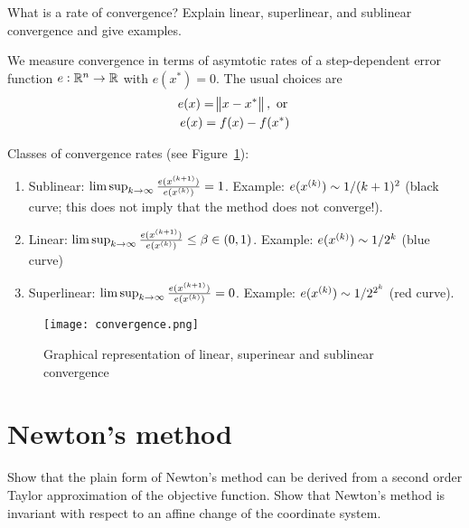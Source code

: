 \documentclass{article}
\begin{document}
\begin{question}
  What is a rate of convergence? Explain linear, superlinear, and sublinear convergence and give
  examples.
\end{question}

We measure convergence in terms of asymtotic rates of a step-dependent error function
\(e: \RR^n \to \RR\) with \(e(x^*) = 0\).  The usual choices are
\begin{gather*}
  e(x) = \enVert[1]{x - x^*}, \text{ or } \\
  e(x) = f(x) - f(x^*)
\end{gather*}

Classes of convergence rates (see Figure~\ref{fig:convergence}):
\begin{enumerate}
\item Sublinear: \(\limsup_{k \to \infty} \frac{e(\kth[k+1]{x})}{e(\kth{x})} = 1\). Example:
  \(e(\kth{x}) \sim 1/(k + 1)^2\) (black curve; this does not imply that the method does not
  converge!).
\item Linear: \(\limsup_{k \to \infty} \frac{e(\kth[k+1]{x})}{e(\kth{x})} \leq \beta \in (0, 1)\).
  Example: \(e(\kth{x}) \sim 1/2^k\) (blue curve)
\item Superlinear: \(\limsup_{k \to \infty} \frac{e(\kth[k+1]{x})}{e(\kth{x})} = 0\). Example:
  \(e(\kth{x}) \sim 1/2^{2^k}\) (red curve).
\end{enumerate}

\begin{figure}[H]
  \centering
  \texttt{[image: convergence.png]}
  \caption{Graphical representation of linear, superinear and sublinear
    convergence \label{fig:convergence}}
\end{figure}

\section{Newton's method}

\begin{question}
  Show that the plain form of Newton’s method can be derived from a second order Taylor
  approximation of the objective function. Show that Newton’s method is invariant with respect to an
  affine change of the coordinate system.
\end{question}
\end{document}
